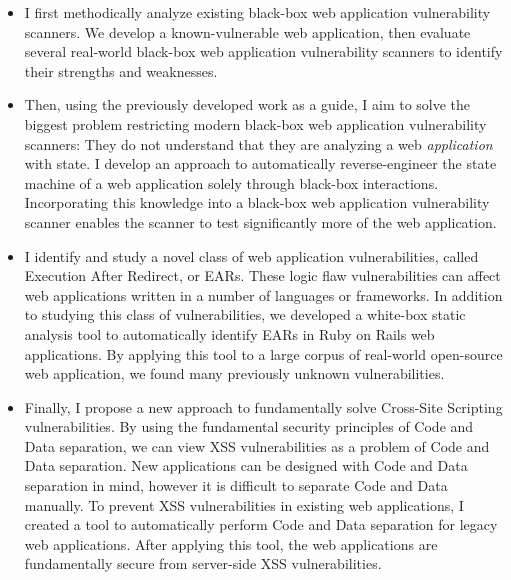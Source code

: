 \begin{itemize}

\item I first methodically analyze existing black-box web application
  vulnerability scanners. We develop a known-vulnerable web
  application, then evaluate several real-world black-box web
  application vulnerability scanners to identify their strengths and
  weaknesses.

\item Then, using the previously developed work as a guide, I aim to
  solve the biggest problem restricting modern black-box web
  application vulnerability scanners: They do not understand that they
  are analyzing a web \emph{application} with state. I develop an
  approach to automatically reverse-engineer the state machine of a
  web application solely through black-box interactions. Incorporating
  this knowledge into a black-box web application vulnerability
  scanner enables the scanner to test significantly more of the web
  application.

\item I identify and study a novel class of web application
  vulnerabilities, called Execution After Redirect, or EARs. These
  logic flaw vulnerabilities can affect web applications written in a
  number of languages or frameworks. In addition to studying this
  class of vulnerabilities, we developed a white-box static analysis
  tool to automatically identify EARs in Ruby on Rails web
  applications. By applying this tool to a large corpus of real-world
  open-source web application, we found many previously unknown
  vulnerabilities.

\item Finally, I propose a new approach to fundamentally solve
  Cross-Site Scripting vulnerabilities. By using the fundamental
  security principles of Code and Data separation, we can view XSS
  vulnerabilities as a problem of Code and Data separation. New
  applications can be designed with Code and Data separation in mind,
  however it is difficult to separate Code and Data manually. To
  prevent XSS vulnerabilities in existing web applications, I created
  a tool to automatically perform Code and Data separation for legacy
  web applications. After applying this tool, the web applications are
  fundamentally secure from server-side XSS vulnerabilities.

\end{itemize}





